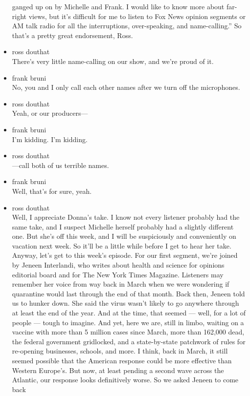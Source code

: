 \begin{itemize}
  ganged up on by Michelle and Frank. I would like to know more about
  far-right views, but it's difficult for me to listen to Fox News
  opinion segments or AM talk radio for all the interruptions,
  over-speaking, and name-calling.'' So that's a pretty great
  endorsement, Ross.
\item
  ross douthat\\
  There's very little name-calling on our show, and we're proud of it.
\item
  frank bruni\\
  No, you and I only call each other names after we turn off the
  microphones.
\item
  ross douthat\\
  Yeah, or our producers---
\item
  frank bruni\\
  I'm kidding. I'm kidding.
\item
  ross douthat\\
  ---call both of us terrible names.
\item
  frank bruni\\
  Well, that's for sure, yeah.
\item
  ross douthat\\
  Well, I appreciate Donna's take. I know not every listener probably
  had the same take, and I suspect Michelle herself probably had a
  slightly different one. But she's off this week, and I will be
  suspiciously and conveniently on vacation next week. So it'll be a
  little while before I get to hear her take. Anyway, let's get to this
  week's episode. For our first segment, we're joined by Jeneen
  Interlandi, who writes about health and science for opinions editorial
  board and for The New York Times Magazine. Listeners may remember her
  voice from way back in March when we were wondering if quarantine
  would last through the end of that month. Back then, Jeneen told us to
  hunker down. She said the virus wasn't likely to go anywhere through
  at least the end of the year. And at the time, that seemed --- well,
  for a lot of people --- tough to imagine. And yet, here we are, still
  in limbo, waiting on a vaccine with more than 5 million cases since
  March, more than 162,000 dead, the federal government gridlocked, and
  a state-by-state patchwork of rules for re-opening businesses,
  schools, and more. I think, back in March, it still seemed possible
  that the American response could be more effective than Western
  Europe's. But now, at least pending a second wave across the Atlantic,
  our response looks definitively worse. So we asked Jeneen to come back

\end{itemize}
